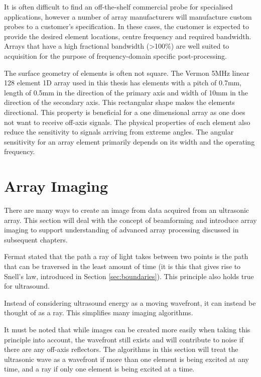 It is often difficult to find an off-the-shelf commercial probe for specialised applications, however a number of array manufacturers will manufacture custom probes to a customer's specification. In these cases, the customer is expected to provide the desired element locations, centre frequency and required bandwidth. Arrays that have a high fractional bandwidth (\textgreater 100\%) are well suited to acquisition for the purpose of frequency-domain specific post-processing.

The surface geometry of elements is often not square. The Vermon 5MHz linear 128 element 1D array used in this thesis has elements with a pitch of 0.7mm, length of 0.5mm in the direction of the primary axis and width of 10mm in the direction of the secondary axis. This rectangular shape makes the elements directional. This property is beneficial for a one dimensional array as one does not want to receive off-axis signals. The physical properties of each element also reduce the sensitivity to signals arriving from extreme angles. The angular sensitivity for an array element primarily depends on its width and the operating frequency. 

\section{Array Imaging}

There are many ways to create an image from data acquired from an ultrasonic array. This section will deal with the concept of beamforming and introduce array imaging to support understanding of advanced array processing discussed in subsequent chapters. 

Fermat stated that the path a ray of light takes between two points is the path that can be traversed in the least amount of time\cite{schuster_introduction_1904} (it is this that gives rise to Snell's law, introduced in Section \ref{sec:boundaries}). This principle also holds true for ultrasound\cite{connolly_application_2009}. 

Instead of considering ultrasound energy as a moving wavefront, it can instead be thought of as a ray. This simplifies many imaging algorithms.

It must be noted that while images can be created more easily when taking this principle into account, the wavefront still exists and will contribute to noise if there are any off-axis reflectors. The algorithms in this section will treat the ultrasonic wave as a wavefront if more than one element is being excited at any time, and a ray if only one element is being excited at a time.

